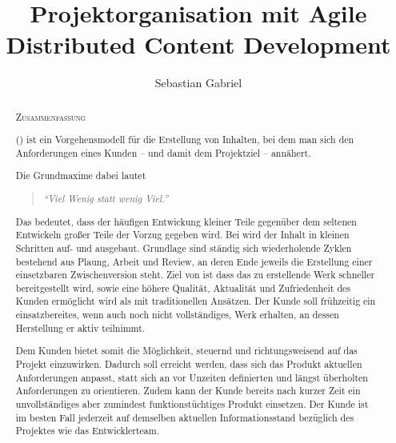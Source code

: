 \documentclass[fontsize=9pt,paper=a4,parskip=half,DIV=11,twocolumn]{scrartcl}
\title{Projektorganisation mit Agile Distributed Content Development}
\author{Sebastian Gabriel}
\begin{document}
\maketitle

\tableofcontents

\vspace{1em}

\begin{abstract}

\begin{center}
{\scshape\large Zusammenfassung}
\end{center}

 (\ADCD{}) ist ein Vorgehensmodell für
die Erstellung von Inhalten, bei dem man sich den Anforderungen eines Kunden -- und
damit dem Projektziel --  annähert.

Die Grundmaxime dabei lautet  

\begin{quote}
\emph{"`Viel Wenig statt wenig Viel."'}
\end{quote}

 Das
bedeutet, dass der häufigen Entwickung kleiner Teile gegenüber dem seltenen
Entwickeln großer Teile der Vorzug gegeben wird.  Bei \ADCD{}
wird der Inhalt in kleinen Schritten auf- und ausgebaut. Grundlage sind
ständig sich wiederholende Zyklen bestehend aus Plaung, Arbeit und Review, an
deren Ende jeweils die Erstellung einer einsetzbaren Zwischenversion steht. 
Ziel von  \ADCD{} ist dass das zu erstellende Werk
schneller bereitgestellt wird, sowie eine höhere Qualität, Aktualität und
Zufriedenheit des Kunden ermöglicht wird als mit traditionellen Ansätzen.  Der
Kunde soll frühzeitig ein einsatzbereites, wenn auch noch nicht vollständiges,
Werk erhalten, an dessen Herstellung er aktiv teilnimmt. 

Dem Kunden bietet \ADCD{} somit
die Möglichkeit, steuernd und richtungsweisend auf das Projekt einzuwirken.
Dadurch soll erreicht werden, dass sich das Produkt aktuellen Anforderungen
anpasst, statt sich an vor Unzeiten definierten und längst überholten
Anforderungen zu orientieren. Zudem kann der Kunde bereits nach kurzer
Zeit ein unvollständiges aber zumindest funktionstüchtiges Produkt einsetzen. Der
Kunde ist im besten Fall jederzeit auf demselben aktuellen Informationsstand
bezüglich des Projektes wie das Entwicklerteam.
\end{abstract}
\end{document}
